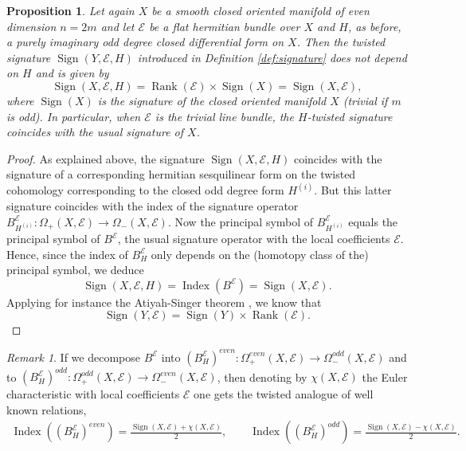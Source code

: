 \documentclass[12pt]{amsart}
\theoremstyle{plain}
\newtheorem{proposition}[theorem]{Proposition}
\theoremstyle{definition}
\theoremstyle{remark}
\newtheorem{remark}[theorem]{Remark}
\begin{document}
{{
\begin{proposition}
Let again $X$ be a smooth closed oriented manifold of even dimension $n=2m$ and let ${\mathcal E}$ be a flat hermitian bundle over $X$ and $H$, as before, a purely imaginary odd degree closed 
differential form on $X$. Then the twisted signature ${\operatorname{Sign}}(Y, {\mathcal E}, H)$ introduced in Definition \ref{def:signature} does not depend on $H$ 
and is given by
$$
{\operatorname{Sign}}(X, {\mathcal E}, H) = {\operatorname{Rank}} ({\mathcal E}) \times {\operatorname{Sign}} (X) = {\operatorname{Sign}} (X, {\mathcal E}),
$$
where ${\operatorname{Sign}} (X)$ is the signature of the closed oriented manifold $X$ (trivial if $m$ is odd). In particular, when ${\mathcal E}$ is the trivial line bundle, 
the $H$-twisted signature coincides 
with the usual signature of $X$.
\end{proposition}
}}

\begin{proof} {{As explained above, the signature ${\operatorname{Sign}}(X, {\mathcal E}, H)$ coincides with the signature of a corresponding hermitian sesquilinear form on the 
twisted cohomology corresponding 
to the closed odd degree form $H^{(i)}$. 
But this latter signature coincides with 
the index of the signature operator $B^{\mathcal E}_{H^{(i)}}: \Omega_+ (X, {\mathcal E}) \to \Omega_- (X, {\mathcal E})$.  Now the principal symbol of $B^{\mathcal E}_{H^{(i)}}$ equals the principal symbol of 
$B^{\mathcal E}$, 
the usual signature operator with the local coefficients
${\mathcal E}$.  Hence, since the index of $B^{\mathcal E}_H$ only depends on the (homotopy class of the) principal symbol, we deduce 
$$
{\operatorname{Sign}}(X, {\mathcal E}, H) = {\operatorname{Index}} (B^{\mathcal E}) = {\operatorname{Sign}} (X, {\mathcal E}).
$$
Applying for instance the Atiyah-Singer theorem \cite{AS3}, we know that 
$$
{\operatorname{Sign}} (Y, {\mathcal E}) = {\operatorname{Sign}} (Y) \times {\operatorname{Rank}} ({\mathcal E}).
$$}}
\end{proof}

\begin{remark}
If we decompose $B^{\mathcal E}$ into 
$(B_H^{\mathcal E})^{even}: \Omega^{even}_+ (X, {\mathcal E})\to \Omega^{odd}_- (X, {\mathcal E})$ and to $(B_H^{\mathcal E})^{odd}: \Omega^{odd}_+ (X, {\mathcal E})\to \Omega^{even}_- (X, {\mathcal E})$, then denoting by 
 $\chi (X, {\mathcal E})$ the Euler characteristic with local coefficients ${\mathcal E}$ one gets the twisted analogue of well known relations,
\begin{multline*}
{\operatorname{Index}} ((B_H^{\mathcal E})^{even}) = \frac{{\operatorname{Sign}} (X, {\mathcal E}) + \chi (X, {\mathcal E})}{2}, \qquad {\operatorname{Index}} ((B_H^{\mathcal E})^{odd}) = \frac{{\operatorname{Sign}} (X, {\mathcal E}) - \chi (X, {\mathcal E})}{2}.
\end{multline*}
\end{remark}
\end{document}

